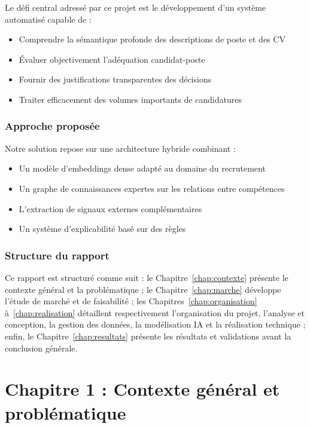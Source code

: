 \documentclass[12pt,a4paper]{report}
\begin{document}
Le défi central adressé par ce projet est le développement d'un système automatisé capable de :
\begin{itemize}
\item {\color{darkgreen}Comprendre la sémantique profonde des descriptions de poste et des CV}
\item {\color{primarygreen}Évaluer objectivement l'adéquation candidat-poste}
\item {\color{darkgreen}Fournir des justifications transparentes des décisions}
\item {\color{primarygreen}Traiter efficacement des volumes importants de candidatures}
\end{itemize}

\section{Approche proposée}

Notre solution repose sur une architecture hybride combinant :
\begin{itemize}
\item {\color{primarygreen}Un modèle d'embeddings dense adapté au domaine du recrutement}
\item {\color{darkgreen}Un graphe de connaissances expertes sur les relations entre compétences}
\item {\color{primarygreen}L'extraction de signaux externes complémentaires}
\item {\color{darkgreen}Un système d'explicabilité basé sur des règles}
\end{itemize}

\section{Structure du rapport}

Ce rapport est structuré comme suit : le Chapitre~\ref{chap:contexte} présente le contexte général et la problématique ; le Chapitre~\ref{chap:marche} développe l'étude de marché et de faisabilité ; les Chapitres~\ref{chap:organisation} à~\ref{chap:realisation} détaillent respectivement l'organisation du projet, l'analyse et conception, la gestion des données, la modélisation IA et la réalisation technique ; enfin, le Chapitre~\ref{chap:resultats} présente les résultats et validations avant la conclusion générale.

\part{Chapitre 1 : Contexte général et problématique}
\label{part:contexte}
\end{document}

